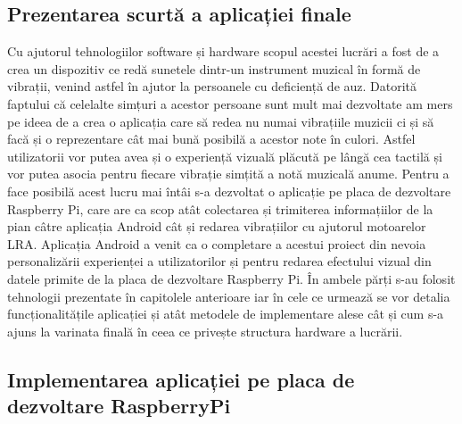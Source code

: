 \documentclass[../IoMusT.tex]{subfiles}
\begin{document}
\subsection{Prezentarea scurtă a aplicației finale}
Cu ajutorul tehnologiilor software și hardware scopul acestei lucrări a fost de a crea un dispozitiv ce redă sunetele dintr-un instrument muzical în formă de vibrații, venind astfel în ajutor la persoanele cu deficiență de auz. Datorită faptului că celelalte simțuri a acestor persoane sunt mult mai dezvoltate am mers pe ideea de a crea o aplicația care să redea nu numai vibrațiile muzicii ci și să facă și o reprezentare cât mai bună posibilă a acestor note în culori. Astfel utilizatorii vor putea avea și o experiență vizuală plăcută pe lângă cea tactilă și vor putea asocia pentru fiecare vibrație simțită a notă muzicală anume. Pentru a face posibilă acest lucru mai întâi s-a dezvoltat o aplicație pe placa de dezvoltare Raspberry Pi, care are ca scop atât colectarea și trimiterea informațiilor de la pian câtre aplicația Android cât și redarea vibrațiilor cu ajutorul motoarelor LRA. Aplicația Android a venit ca o completare a acestui proiect din nevoia personalizării experienței a utilizatorilor și pentru redarea efectului vizual din datele primite de la placa de dezvoltare Raspberry Pi. În ambele părți s-au folosit tehnologii prezentate în capitolele anterioare iar în cele ce urmează se vor detalia funcționalitățile aplicației și atât metodele de implementare alese cât și cum s-a ajuns la varinata finală în ceea ce privește structura hardware a lucrării.
\subsection{Implementarea aplicației pe placa de dezvoltare RaspberryPi}
\end{document}
